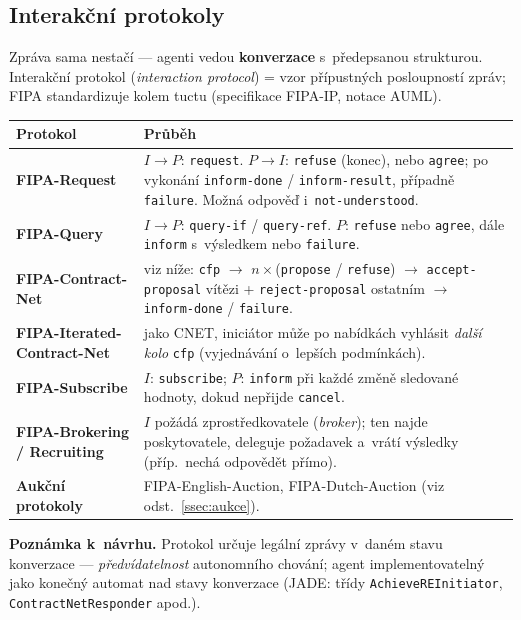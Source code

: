 \documentclass[11pt,a4paper]{article}
\theoremstyle{definition}
\begin{document}
\subsection{Interakční protokoly}

Zpráva sama nestačí --- agenti vedou \textbf{konverzace} s~předepsanou strukturou.
Interakční protokol (\emph{interaction protocol}) = vzor přípustných posloupností zpráv;
FIPA standardizuje kolem tuctu (specifikace FIPA-IP, notace AUML).

\begin{center}\small
\begin{tabular}{p{} p{}}
\toprule
\textbf{Protokol} & \textbf{Průběh} \\
\midrule
\textbf{FIPA-Request}
  & $I \to P$: \texttt{request}. $P \to I$: \texttt{refuse} (konec), nebo \texttt{agree};
    po vykonání \texttt{inform-done} / \texttt{inform-result}, případně \texttt{failure}.
    Možná odpověď i~\texttt{not-understood}. \\
\textbf{FIPA-Query}
  & $I \to P$: \texttt{query-if} / \texttt{query-ref}. $P$: \texttt{refuse} nebo \texttt{agree},
    dále \texttt{inform} s~výsledkem nebo \texttt{failure}. \\
\textbf{FIPA-Contract-Net}
  & viz níže: \texttt{cfp} $\to$ $n\times$(\texttt{propose} / \texttt{refuse}) $\to$
    \texttt{accept-proposal} vítězi + \texttt{reject-proposal} ostatním $\to$
    \texttt{inform-done} / \texttt{failure}. \\
\textbf{FIPA-Iterated-Contract-Net}
  & jako CNET, iniciátor může po nabídkách vyhlásit \emph{další kolo} \texttt{cfp}
    (vyjednávání o~lepších podmínkách). \\
\textbf{FIPA-Subscribe}
  & $I$: \texttt{subscribe}; $P$: \texttt{inform} při každé změně sledované hodnoty,
    dokud nepřijde \texttt{cancel}. \\
\textbf{FIPA-Brokering / Recruiting}
  & $I$ požádá zprostředkovatele (\emph{broker}); ten najde poskytovatele, deleguje
    požadavek a~vrátí výsledky (příp.\ nechá odpovědět přímo). \\
\textbf{Aukční protokoly}
  & FIPA-English-Auction, FIPA-Dutch-Auction (viz odst.~\ref{ssec:aukce}). \\
\bottomrule
\end{tabular}
\end{center}

\textbf{Poznámka k~návrhu.} Protokol určuje legální zprávy v~daném stavu konverzace ---
\emph{předvídatelnost} autonomního chování; agent implementovatelný jako konečný automat nad
stavy konverzace (JADE: třídy \texttt{AchieveREInitiator}, \texttt{ContractNetResponder} apod.).
\end{document}
